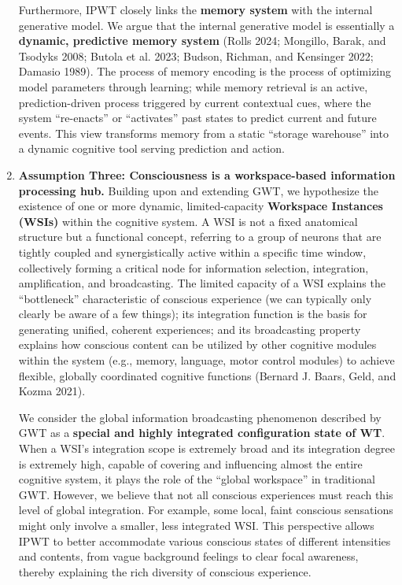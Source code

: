 \documentclass[
  a4paper]{article}
\begin{document}
\begin{enumerate}
  Furthermore, IPWT closely links the \textbf{memory system} with the
  internal generative model. We argue that the internal generative model
  is essentially a \textbf{dynamic, predictive memory system} (Rolls
  2024; Mongillo, Barak, and Tsodyks 2008; Butola et al. 2023; Budson,
  Richman, and Kensinger 2022; Damasio 1989). The process of memory
  encoding is the process of optimizing model parameters through
  learning; while memory retrieval is an active, prediction-driven
  process triggered by current contextual cues, where the system
  ``re-enacts'' or ``activates'' past states to predict current and
  future events. This view transforms memory from a static ``storage
  warehouse'' into a dynamic cognitive tool serving prediction and
  action.
\item
  \textbf{Assumption Three: Consciousness is a workspace-based
  information processing hub.} Building upon and extending GWT, we
  hypothesize the existence of one or more dynamic, limited-capacity
  \textbf{Workspace Instances (WSIs)} within the cognitive system. A WSI
  is not a fixed anatomical structure but a functional concept,
  referring to a group of neurons that are tightly coupled and
  synergistically active within a specific time window, collectively
  forming a critical node for information selection, integration,
  amplification, and broadcasting. The limited capacity of a WSI
  explains the ``bottleneck'' characteristic of conscious experience (we
  can typically only clearly be aware of a few things); its integration
  function is the basis for generating unified, coherent experiences;
  and its broadcasting property explains how conscious content can be
  utilized by other cognitive modules within the system (e.g., memory,
  language, motor control modules) to achieve flexible, globally
  coordinated cognitive functions (Bernard J. Baars, Geld, and Kozma
  2021).

  We consider the global information broadcasting phenomenon described
  by GWT as a \textbf{special and highly integrated configuration state
  of WT}. When a WSI's integration scope is extremely broad and its
  integration degree is extremely high, capable of covering and
  influencing almost the entire cognitive system, it plays the role of
  the ``global workspace'' in traditional GWT. However, we believe that
  not all conscious experiences must reach this level of global
  integration. For example, some local, faint conscious sensations might
  only involve a smaller, less integrated WSI. This perspective allows
  IPWT to better accommodate various conscious states of different
  intensities and contents, from vague background feelings to clear
  focal awareness, thereby explaining the rich diversity of conscious
  experience.


\end{enumerate}
\end{document}

